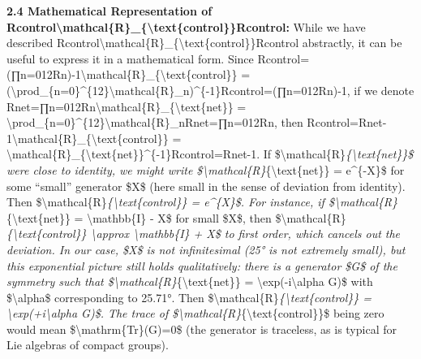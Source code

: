 \documentclass[
]{article}
\begin{document}
\textbf{2.4 Mathematical Representation of
Rcontrol\textbackslash mathcal\{R\}\_\{\textbackslash text\{control\}\}Rcontrol\hspace{0pt}:}
While we have described
Rcontrol\textbackslash mathcal\{R\}\_\{\textbackslash text\{control\}\}Rcontrol\hspace{0pt}
abstractly, it can be useful to express it in a mathematical form. Since
Rcontrol=(∏n=012Rn)-1\textbackslash mathcal\{R\}\_\{\textbackslash text\{control\}\}
=
(\textbackslash prod\_\{n=0\}\^{}\{12\}\textbackslash mathcal\{R\}\_n)\^{}\{-1\}Rcontrol\hspace{0pt}=(∏n=012\hspace{0pt}Rn\hspace{0pt})-1,
if we denote
Rnet=∏n=012Rn\textbackslash mathcal\{R\}\_\{\textbackslash text\{net\}\}
=
\textbackslash prod\_\{n=0\}\^{}\{12\}\textbackslash mathcal\{R\}\_nRnet\hspace{0pt}=∏n=012\hspace{0pt}Rn\hspace{0pt},
then
Rcontrol=Rnet-1\textbackslash mathcal\{R\}\_\{\textbackslash text\{control\}\}
=
\textbackslash mathcal\{R\}\_\{\textbackslash text\{net\}\}\^{}\{-1\}Rcontrol\hspace{0pt}=Rnet-1\hspace{0pt}.
If \$\textbackslash mathcal\{R\}\emph{\{\textbackslash text\{net\}\}\$
were close to identity, we might write
\$\textbackslash mathcal\{R\}}\{\textbackslash text\{net\}\} =
e\^{}\{-X\}\$ for some ``small'' generator \$X\$ (here small in the
sense of deviation from identity). Then
\$\textbackslash mathcal\{R\}\emph{\{\textbackslash text\{control\}\} =
e\^{}\{X\}\$. For instance, if
\$\textbackslash mathcal\{R\}}\{\textbackslash text\{net\}\} =
\textbackslash mathbb\{I\} - X\$ for small \$X\$, then
\$\textbackslash mathcal\{R\}\emph{\{\textbackslash text\{control\}\}
\textbackslash approx \textbackslash mathbb\{I\} + X\$ to first order,
which cancels out the deviation. In our case, \$X\$ is not infinitesimal
(25° is not extremely small), but this exponential picture still holds
qualitatively: there is a generator \$G\$ of the symmetry such that
\$\textbackslash mathcal\{R\}}\{\textbackslash text\{net\}\} =
\textbackslash exp(-i\textbackslash alpha G)\$ with
\$\textbackslash alpha\$ corresponding to 25.71°. Then
\$\textbackslash mathcal\{R\}\emph{\{\textbackslash text\{control\}\} =
\textbackslash exp(+i\textbackslash alpha G)\$. The trace of
\$\textbackslash mathcal\{R\}}\{\textbackslash text\{control\}\}\$ being
zero would mean \$\textbackslash mathrm\{Tr\}(G)=0\$ (the generator is
traceless, as is typical for Lie algebras of compact groups).
\end{document}
